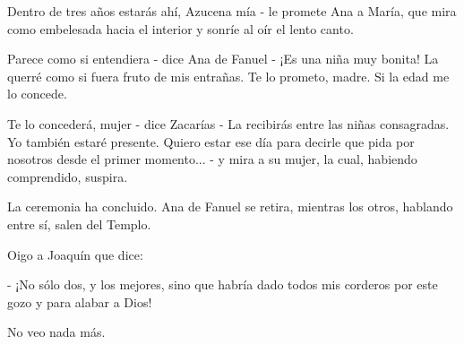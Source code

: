 \documentclass[12pt]{book} %
\begin{document}
Dentro de tres años estarás ahí, Azucena mía - le promete Ana a María, que mira como embelesada hacia el interior y sonríe al oír el lento canto. 

Parece como si entendiera - dice Ana de Fanuel - ¡Es una niña muy bonita! La querré como si fuera fruto de mis entrañas. Te lo prometo, madre. Si la edad me lo concede. 

Te lo concederá, mujer - dice Zacarías - La recibirás entre las niñas consagradas. Yo también estaré presente. Quiero estar ese día para decirle que pida por nosotros desde el primer momento... - y mira a su mujer, la cual, habiendo comprendido, suspira. 

La ceremonia ha concluido. Ana de Fanuel se retira, mientras los otros, hablando entre sí, salen del Templo. 

Oigo a Joaquín que dice: 

- ¡No sólo dos, y los mejores, sino que habría dado todos mis corderos por este gozo y para alabar a Dios! 

No veo nada más. 
\end{document}
